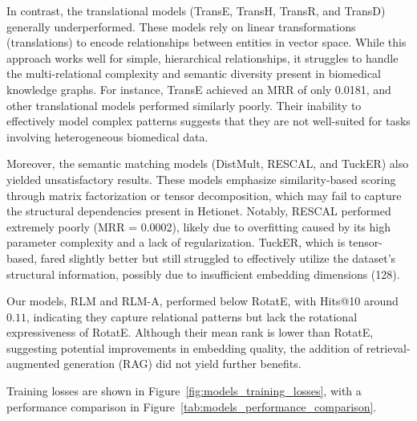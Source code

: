 In contrast, the translational models (TransE, TransH, TransR, and TransD) generally underperformed. These models rely on linear transformations (translations) to encode relationships between entities in vector space. While this approach works well for simple, hierarchical relationships, it struggles to handle the multi-relational complexity and semantic diversity present in biomedical knowledge graphs. For instance, TransE achieved an MRR of only 0.0181, and other translational models performed similarly poorly. Their inability to effectively model complex patterns suggests that they are not well-suited for tasks involving heterogeneous biomedical data.

Moreover, the semantic matching models (DistMult, RESCAL, and TuckER) also yielded unsatisfactory results. These models emphasize similarity-based scoring through matrix factorization or tensor decomposition, which may fail to capture the structural dependencies present in Hetionet. Notably, RESCAL performed extremely poorly (MRR = 0.0002), likely due to overfitting caused by its high parameter complexity and a lack of regularization. TuckER, which is tensor-based, fared slightly better but still struggled to effectively utilize the dataset’s structural information, possibly due to insufficient embedding dimensions (128).

Our models, RLM and RLM-A, performed below RotatE, with Hits@10 around $0.11$, indicating they capture relational patterns but lack the rotational expressiveness of RotatE.
Although their mean rank is lower than RotatE, suggesting potential improvements in embedding quality, the addition of retrieval-augmented generation (RAG) did not yield further benefits.

Training losses are shown in Figure~\ref{fig:models_training_losses}, with a performance comparison in Figure~\ref{tab:models_performance_comparison}.




